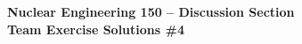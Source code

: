 \documentclass{report}
\begin{document}
\begin{center}
\textbf{\large Nuclear Engineering 150 -- Discussion Section}\\ 
\textbf{Team Exercise Solutions \#4}
\end{center}



\newpage



\end{document}
